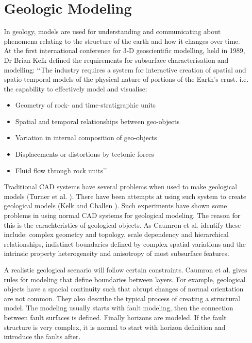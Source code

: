 \documentclass[a4paper,12pt]{report}
\begin{document}
\section{Geologic Modeling}
In geology, models are used for understanding and communicating about phenomena relating to the structure of the earth and how it changes over time. At the first international conference for 3-D geoscientific modelling, held in 1989, Dr Brian Kelk defined the requirements for subsurface characterisation and modelling:
‘‘The industry requires a system for interactive creation
of spatial and spatio-temporal models of the physical
nature of portions of the Earth’s crust. i.e. the
capability to effectively model and visualise:
\begin{itemize}
 \item Geometry of rock- and time-stratigraphic units
 \item Spatial and temporal relationships between geo-objects
 \item Variation in internal composition of geo-objects
 \item Displacements or distortions by tectonic forces
 \item Fluid flow through rock units’’ \cite{turner1992three}
\end{itemize}

Traditional CAD systems have several problems when used to make geological models (Turner et al. \cite{turner2006challenges}). There have been attempts at using such system to create geological models (Kelk and Challen \cite{kelk1992experiments}). Such experiments have shown some problems in using normal CAD systems for geological modeling. The reason for this is the carachteristics of geological objects. As Caumron et al. \cite{caumon2009surface} identify these include: complex geometry and topology, scale dependency and hierarchical relationships, indistinct boundaries defined by complex spatial variations and the intrinsic property heterogeneity and anisotropy of most subsurface features. 

A realistic geological scenario will follow certain constraints.  Caumron et al. gives rules for modeling that define boundaries between layers. For example, geological objects have a spacial continuity such that abrupt changes of normal orientation are not common. They also describe  the typical process of creating a structural model. The modeling usually starts with fault modeling, then the connection between fault surfaces is defined. Finally horizons are modeled. If the fault structure is very complex, it is normal to start with horizon definition and introduce the faults after. 
\end{document}
